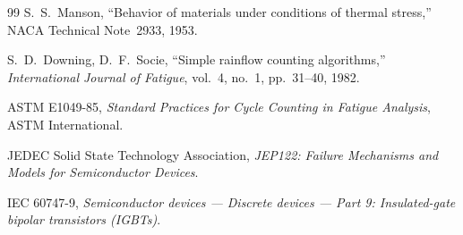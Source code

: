 \documentclass[11pt,a4paper]{article}
\begin{document}
\begin{thebibliography}{99}
S.~S.~Manson,
``Behavior of materials under conditions of thermal stress,''
NACA Technical Note~2933, 1953.

S.~D.~Downing, D.~F.~Socie,
``Simple rainflow counting algorithms,''
\emph{International Journal of Fatigue}, vol.~4, no.~1, pp.~31--40, 1982.

ASTM E1049-85,
\emph{Standard Practices for Cycle Counting in Fatigue Analysis},
ASTM International.

JEDEC Solid State Technology Association,
\emph{JEP122: Failure Mechanisms and Models for Semiconductor Devices}.

IEC 60747-9,
\emph{Semiconductor devices --- Discrete devices --- Part 9: Insulated-gate
bipolar transistors (IGBTs)}.

\end{thebibliography}
\end{document}
